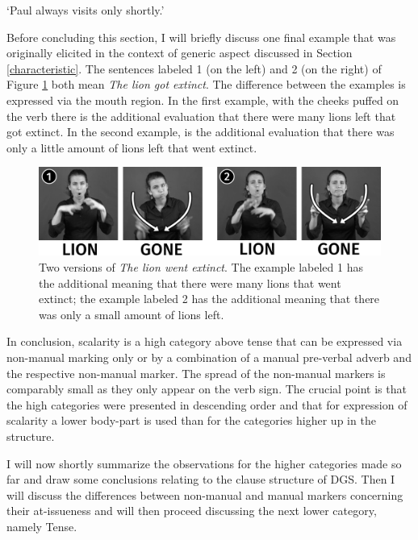 \begin{exe}
\ex {} 
\glt `Paul always visits only shortly.'\label{bsp:shortvisitpaul}
\end{exe}

\noindent Before concluding this section, I will briefly discuss one final example that was originally elicited in the context of generic aspect discussed in Section \ref{characteristic}. The sentences labeled 1 (on the left) and 2 (on the right) of Figure \ref{fig:littlemuchlion} both mean \textit{The lion got extinct}. The difference between the examples is expressed via the mouth region. In the first example, with the cheeks puffed on the verb there is the additional evaluation that there were many lions left that got extinct. In the second example, is the additional evaluation that there was only a little amount of lions left that went extinct. 

\begin{figure}[bt]
\centering
	\includegraphics[width=1.0\textwidth]{littlemuchlion2sw.jpg}
	\caption{Two versions of \textit{The lion went extinct}. The example labeled 1 has the additional meaning that there were many lions that went extinct; the example labeled 2 has the additional meaning that there was only a small amount of lions left.}
	\label{fig:littlemuchlion}
\end{figure}

In conclusion, scalarity is a high category above tense that can be expressed via non-manual marking only or by a combination of a manual pre-verbal adverb and the respective non-manual marker. The spread of the non-manual markers is comparably small as they only appear on the verb sign. The crucial point is that the high categories were presented in descending order and that for expression of scalarity a lower body-part is used than for the categories higher up in the structure. 

I will now shortly summarize the observations for the higher categories made so far and draw some conclusions relating to the clause structure of DGS. Then I will discuss the differences between non-manual and manual markers concerning their at-issueness and will then proceed discussing the next lower category, namely Tense.

